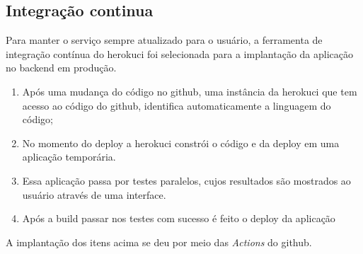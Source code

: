 \subsection{Integração continua}
Para manter o serviço sempre atualizado para o usuário, a ferramenta de integração contínua do \gls{herokuci} foi selecionada para a implantação da aplicação no \gls{backend} em produção.

\begin{enumerate}
    \item Após uma mudança do código no \gls{github}, uma instância da \gls{herokuci} que tem acesso ao código do \gls{github}, identifica automaticamente
    a linguagem do código; 
    \item No momento do \gls{deploy} a \gls{herokuci} constrói o código e da \gls{deploy} em uma aplicação temporária.
    \item Essa aplicação passa por testes paralelos, cujos resultados são mostrados ao usuário através de uma interface.
    \item Após a build passar nos testes com sucesso é feito o \gls{deploy} da aplicação 
\end{enumerate} 

A implantação dos itens acima se deu por meio das \emph{Actions} do \gls{github}.